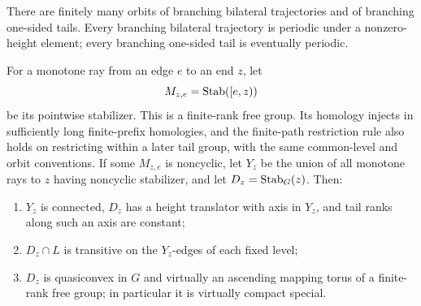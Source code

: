 \begin{lemma}\label{gate:tail-groups}
There are finitely many orbits of branching bilateral trajectories and of
branching one-sided tails.  Every branching bilateral trajectory is
periodic under a nonzero-height element; every branching one-sided tail
is eventually periodic.

For a monotone ray from an edge $e$ to an end $z$, let
\[
 M_{z,e}=\operatorname{Stab}([e,z))
\]
be its pointwise stabilizer.  This is a finite-rank free group.  Its
homology injects in sufficiently long finite-prefix homologies, and the
finite-path restriction rule also holds on restricting within a later
tail group, with the same common-level and orbit conventions.  If some
$M_{z,e}$ is noncyclic, let $Y_z$ be the union
of all monotone rays to $z$ having noncyclic stabilizer, and let
$D_z=\operatorname{Stab}_G(z)$.  Then:
\begin{enumerate}[label=(\roman*)]
\item $Y_z$ is connected, $D_z$ has a height translator with axis in $Y_z$,
and tail ranks along such an axis are constant;
\item $D_z\cap L$ is transitive on the $Y_z$-edges of each fixed level;
\item $D_z$ is quasiconvex in $G$ and virtually an ascending mapping torus
of a finite-rank free group; in particular it is virtually compact special.
\end{enumerate}
\end{lemma}
